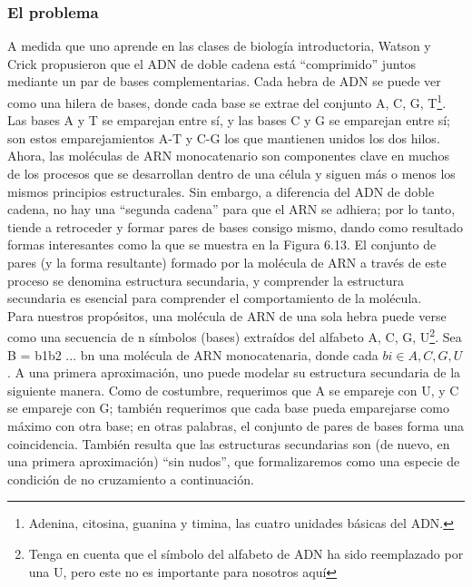 \documentclass[a4paper, 12pt]{book}
\theoremstyle{dotless}
\begin{document}
\subsubsection*{El problema}

A medida que uno aprende en las clases de biología introductoria, Watson y Crick propusieron que el ADN de doble cadena está ``comprimido'' juntos mediante un par de bases complementarias. Cada hebra de ADN se puede ver como una hilera de bases, donde cada base se extrae del conjunto {A, C, G, T}\footnote{Adenina, citosina, guanina y timina, las cuatro unidades básicas del ADN.}.  Las bases A y T se emparejan entre sí, y las bases C y G se emparejan entre sí; son estos emparejamientos A-T y C-G los que mantienen unidos los dos hilos.\\

Ahora, las moléculas de ARN monocatenario son componentes clave en muchos de los procesos que se desarrollan dentro de una célula y siguen más o menos los mismos principios estructurales. Sin embargo, a diferencia del ADN de doble cadena, no hay una ``segunda cadena'' para que el ARN se adhiera; por lo tanto, tiende a retroceder y formar pares de bases consigo mismo, dando como resultado formas interesantes como la que se muestra en la Figura 6.13. El conjunto de pares (y la forma resultante) formado por la molécula de ARN a través de este proceso se denomina estructura secundaria, y comprender la estructura secundaria es esencial para comprender el comportamiento de la molécula.\\

Para nuestros propósitos, una molécula de ARN de una sola hebra puede verse como una secuencia de n símbolos (bases) extraídos del alfabeto {A, C, G, U}\footnote{Tenga en cuenta que el símbolo del alfabeto de ADN ha sido reemplazado por una U, pero este no es importante para nosotros aquí}. Sea B = b1b2 ... bn una molécula de ARN monocatenaria, donde cada $bi  \in  {A, C, G, U}$. A una primera aproximación, uno puede modelar su estructura secundaria de la siguiente manera. Como de costumbre, requerimos que A se empareje con U, y C se empareje con G; también requerimos que cada base pueda emparejarse como máximo con otra base; en otras palabras, el conjunto de pares de bases forma una coincidencia. También resulta que las estructuras secundarias son (de nuevo, en una primera aproximación) ``sin nudos'', que formalizaremos como una especie de condición de no cruzamiento a continuación.\\
\end{document}
